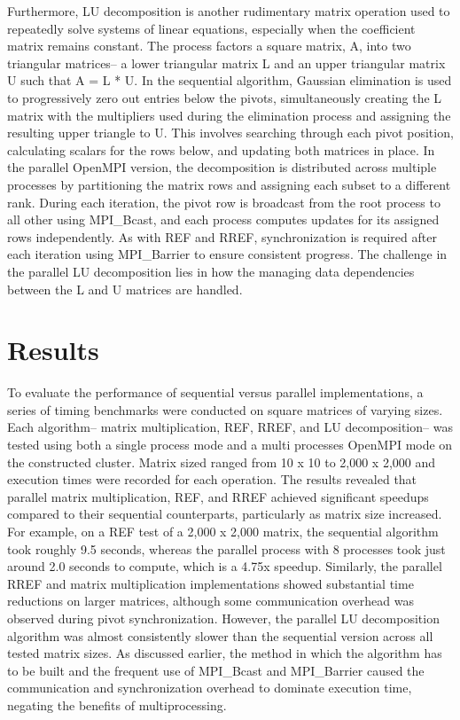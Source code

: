 \documentclass[12pt]{article}
\begin{document}
Furthermore, LU decomposition is another rudimentary matrix operation used to repeatedly solve systems of linear equations, especially when the coefficient matrix remains constant. The process factors a square matrix, A, into two triangular matrices-- a lower triangular matrix L and an upper triangular matrix U such that A = L * U. In the sequential algorithm, Gaussian elimination is used to progressively zero out entries below the pivots, simultaneously creating the L matrix with the multipliers used during the elimination process and assigning the resulting upper triangle to U. This involves searching through each pivot position, calculating scalars for the rows below, and updating both matrices in place. In the parallel OpenMPI version, the decomposition is distributed across multiple processes by partitioning the matrix rows and assigning each subset to a different rank. During each iteration, the pivot row is broadcast from the root process to all other using MPI\_Bcast, and each process computes updates for its assigned rows independently. As with REF and RREF, synchronization is required after each iteration using MPI\_Barrier to ensure consistent progress. The challenge in the parallel LU decomposition lies in how the managing data dependencies between the L and U matrices are handled. 

\section{Results}
To evaluate the performance of sequential versus parallel implementations, a series of timing benchmarks were conducted on square matrices of varying sizes. Each algorithm-- matrix multiplication, REF, RREF, and LU decomposition-- was tested using both a single process mode and a multi processes OpenMPI mode on the constructed cluster. Matrix sized ranged from 10 x 10 to 2,000 x 2,000 and execution times were recorded for each operation.
The results revealed that parallel matrix multiplication, REF, and RREF achieved significant speedups compared to their sequential counterparts, particularly as matrix size increased. For example, on a REF test of a 2,000 x 2,000 matrix, the sequential algorithm took roughly 9.5 seconds, whereas the parallel process with 8 processes took just around 2.0 seconds to compute, which is a 4.75x speedup. Similarly, the parallel RREF and matrix multiplication implementations showed substantial time reductions on larger matrices, although some communication overhead was observed during pivot synchronization.
However, the parallel LU decomposition algorithm was almost consistently slower than the sequential version across all tested matrix sizes. As discussed earlier, the method in which the algorithm has to be built and the frequent use of MPI\_Bcast and MPI\_Barrier caused the communication and synchronization overhead to dominate execution time, negating the benefits of multiprocessing. 
\end{document}
